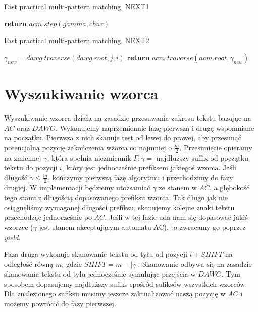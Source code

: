 \documentclass[a4paper,11pt]{article}
\begin{document}
\begin{algorithm}
\caption{Fast practical multi-pattern matching, NEXT1}
\begin{algorithmic}[1]
\State \textbf{return} $ acm.step(gamma, char)$ 
\EndProcedure
\end{algorithmic}
\end{algorithm}

\begin{algorithm}
\caption{Fast practical multi-pattern matching, NEXT2}
\begin{algorithmic}[1]
 
\State $\gamma_{new} = dawg.traverse(dawg.root, j, i)$ 
\State \textbf{return} $ acm.traverse(acm.root, \gamma_{new})$ 
\EndProcedure
\end{algorithmic}
\end{algorithm}

\section{Wyszukiwanie wzorca}

Wyszukiwanie wzorca działa na zasadzie przesuwania zakresu tekstu bazując na $AC$ oraz $DAWG$. Wykonujemy naprzemiennie fazę pierwszą i drugą wspomniane na początku. Pierwsza z nich skanuje test od lewej do prawej, aby przesunąć potencjalną pozycję zakończenia wzorca co najmniej o $\frac{m}{2}$. Przesunięcie opieramy na zmiennej $\gamma$, która spełnia niezmiennik $\Gamma: \gamma = $ najdłuższy suffix od początku tekstu do pozycji $i$, który jest jednocześnie prefiksem jakiegoś wzorca. Jeśli długość $\gamma \leq \frac{m}{2}$, kończymy pierwszą fazę algorytmu i przechodzimy do fazy drugiej. W implementacji będziemy utożsamiać $\gamma$ ze stanem w $AC$, a głębokość tego stanu z długością dopasowanego prefiksu wzorca. Tak długo jak nie osiągnęliśmy wymaganej długości prefiksu, skanujemy kolejne znaki tekstu przechodząc jednocześnie po $AC$. Jeśli w tej fazie uda nam się dopasować jakiś wzorzec ($\gamma$ jest stanem akceptującym automatu AC), to zwracamy go poprzez \textit{yield}.

Faza druga wykonuje skanowanie tekstu od tyłu od pozycji $i + SHIFT$ na odległość równą $m$, gdzie $SHIFT = m - |\gamma|$. Skanowanie odbywa się na zasadzie skanowania tekstu od tyłu jednocześnie symulując przejścia w $DAWG$. Tym sposobem dopasujemy najdłuższy sufiks spośród sufiksów wszystkich wzorców. Dla znalezionego sufiksu musimy jeszcze zaktualizować naszą pozycję w $AC$ i możemy powrócić do fazy pierwszej. 
\end{document}
